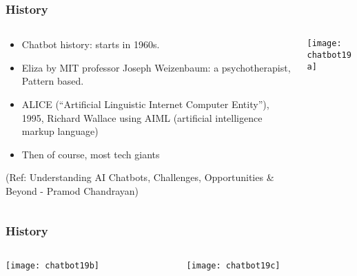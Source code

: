 \begin{frame}[fragile]\frametitle{History}

    \begin{columns}
    \begin{column}[t]{0.5\linewidth}
	\begin{itemize}
	\item Chatbot history: starts in 1960s.
	\item Eliza by MIT professor Joseph Weizenbaum: a psychotherapist, Pattern based.
	\item ALICE (``Artificial Linguistic Internet Computer Entity''), 1995, Richard Wallace using AIML (artificial intelligence markup language)
	\item Then of course, most tech giants
	\end{itemize}
	
\tiny{(Ref: Understanding AI Chatbots, Challenges, Opportunities \& Beyond - Pramod Chandrayan)}

	
    \end{column}
    \begin{column}[t]{0.5\linewidth}
\begin{center}
\texttt{[image: chatbot19a]}

\end{center}
    \end{column}
  \end{columns}
  
  

	
\end{frame}

\begin{frame}[fragile]\frametitle{History}

    \begin{columns}
    \begin{column}[t]{0.5\linewidth}
\begin{center}
\texttt{[image: chatbot19b]}

\end{center}
    \end{column}
    \begin{column}[t]{0.5\linewidth}
\begin{center}
\texttt{[image: chatbot19c]}

\end{center}
    \end{column}
  \end{columns}
  
  

	
\end{frame}


